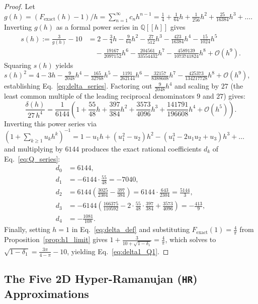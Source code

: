 \documentclass[11pt,a4paper]{article}
\theoremstyle{spacious}
\theoremstyle{spaciousdef}
\begin{document}
\begin{proof}
Let $g(h) = (F_{\text{exact}}(h) - 1)/h = \sum_{n=1}^{\infty} c_n h^{n-1} = \tfrac{1}{4} + \tfrac{1}{64}h + \tfrac{1}{256}h^2 + \tfrac{25}{16384}h^3 + \dots$. Inverting $g(h)$ as a formal power series in $\mathbb{Q}[[h]]$ gives
\[
\begin{aligned}
s(h) := \frac{3}{g(h)} - 10 &= 2 - \frac{3}{4}h - \frac{9}{64}h^2 - \frac{27}{512}h^3 - \frac{423}{16384}h^4 - \frac{15}{1024}h^5 \\
&\quad - \frac{19167}{2097152}h^6 - \frac{204561}{33554432}h^7 - \frac{4589139}{1073741824}h^8 + \mathcal{O}(h^9).
\end{aligned}
\]
Squaring $s(h)$ yields $s(h)^2 = 4 - 3h - \tfrac{9}{2048}h^4 - \tfrac{165}{32768}h^5 - \tfrac{1191}{262144}h^6 - \tfrac{32157}{8388608}h^7 - \tfrac{425373}{134217728}h^8 + \mathcal{O}(h^9)$, establishing Eq.~\eqref{eq:delta_series}. Factoring out $\tfrac{9}{2048}h^4$ and scaling by $27$ (the least common multiple of the leading reciprocal denominators $9$ and $27$) gives:
\[
\frac{\delta(h)}{27\,h^4} = \frac{1}{6144}\left(1 + \frac{55}{48}h + \frac{397}{384}h^2 + \frac{3573}{4096}h^3 + \frac{141791}{196608}h^4 + \mathcal{O}(h^5)\right).
\]
Inverting this power series via $\left(1 + \sum_{k\ge 1} u_k h^k\right)^{-1} = 1 - u_1 h + (u_1^2 - u_2)h^2 - (u_1^3 - 2u_1 u_2 + u_3)h^3 + \dots$ and multiplying by $6144$ produces the exact rational coefficients $d_k$ of Eq.~\eqref{eq:Q_series}:
\begin{align*}
d_0 &= 6144,\\
d_1 &= -6144 \cdot \frac{55}{48} = -7040,\\
d_2 &= 6144 \left(\frac{3025}{2304} - \frac{397}{384}\right) = 6144 \cdot \frac{643}{2304} = \frac{5144}{3},\\
d_3 &= -6144 \left(\frac{166375}{110592} - 2\cdot\frac{55}{48}\cdot\frac{397}{384} + \frac{3573}{4096}\right) = -\frac{413}{9},\\
d_4 &= -\frac{1081}{108}.
\end{align*}
Finally, setting $h = 1$ in Eq.~\eqref{eq:delta_def} and substituting $F_{\text{exact}}(1) = \tfrac{4}{\pi}$ from Proposition~\ref{prop:h1_limit} gives $1 + \tfrac{3}{10 + \sqrt{1 - \delta_1}} = \tfrac{4}{\pi}$, which solves to $\sqrt{1 - \delta_1} = \tfrac{3\pi}{4-\pi} - 10$, yielding Eq.~\eqref{eq:delta1_Q1}.
\end{proof}

\subsection{The Five 2D Hyper-Ramanujan (\texttt{HR}) Approximations}
\end{document}
